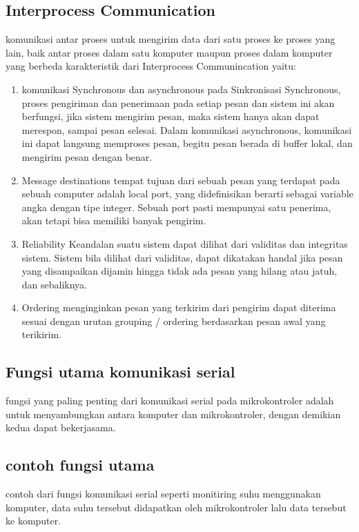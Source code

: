 	\subsection{Interprocess Communication}
	komunikasi antar proses untuk mengirim data dari satu proses ke proses yang lain, baik antar proses dalam satu komputer maupun proses dalam komputer yang berbeda
	karakteristik dari Interprocess Communincation yaitu:
		\begin{enumerate}
			\item komunikasi Synchronous dan asynchronous
				pada Sinkronisasi Synchronous, proses pengiriman dan penerimaan pada setiap pesan dan sistem ini akan berfungsi, jika sistem mengirim pesan, maka sistem hanya akan dapat merespon, sampai pesan selesai. Dalam komunikasi asynchronous, komunikasi ini dapat langsung memproses pesan, begitu pesan berada di buffer lokal, dan mengirim pesan dengan benar.
			\item Message destinations
					tempat tujuan dari sebuah pesan yang terdapat pada  sebuah computer adalah local port, yang didefinisikan berarti sebagai variable angka dengan tipe integer. Sebuah port pasti mempunyai satu penerima, akan tetapi bisa memiliki banyak pengirim.
			\item Reliability
					Keandalan suatu sistem dapat dilihat dari validitas dan integritas sistem.
					Sistem bila dilihat dari validitas, dapat dikatakan handal jika pesan yang disampaikan dijamin hingga tidak ada pesan yang hilang atau jatuh, dan sebaliknya.
			\item Ordering
				  menginginkan pesan yang terkirim dari pengirim dapat diterima sesuai dengan urutan grouping / ordering berdasarkan pesan awal yang terikirim.
		\end{enumerate}

	\subsection{Fungsi utama komunikasi serial}
		fungsi yang paling penting dari komunikasi serial pada mikrokontroler adalah untuk menyambungkan antara komputer dan mikrokontroler, dengan demikian kedua dapat bekerjasama.
	
	\subsection{contoh fungsi utama}
	contoh dari fungsi komunikasi serial seperti monitiring suhu menggunakan komputer, data suhu tersebut didapatkan oleh mikrokontroler lalu data tersebut ke komputer.
	
